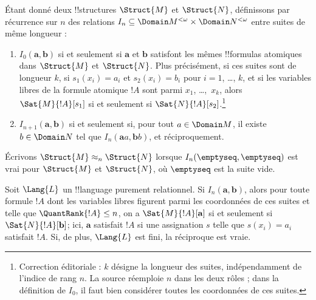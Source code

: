 \documentclass[../../../include/open-logic-section]{subfiles}
\begin{document}
\begin{defn}
  Étant donné deux !!{structure}s $\Struct{M}$ et $\Struct{N}$,
  définissons par récurrence sur $n$ des relations
  $I_n \subseteq \Domain M^{<\omega} \times \Domain N^{<\omega}$
  entre suites de même longueur :
   \begin{enumerate}
   \item $I_0(\mathbf{a},\mathbf{b})$ si et seulement si
     $\mathbf{a}$ et $\mathbf{b}$ satisfont les mêmes
     !!{formula}s atomiques dans $\Struct{M}$ et $\Struct{N}$.
     Plus précisément, si ces suites sont de longueur $k$,
     si $s_1(x_i) = a_i$ et $s_2(x_i) = b_i$ pour
     $i=1$, \dots, $k$, et si les variables libres de
     la formule atomique $!A$ sont parmi $x_1$, \dots,~$x_k$,
     alors $\Sat{M}{!A}[s_1]$ si et seulement si
     $\Sat{N}{!A}[s_2]$.\footnote{Correction éditoriale : $k$ désigne la longueur des suites, indépendamment de l'indice de rang $n$. La source réemploie $n$ dans les deux rôles ; dans la définition de $I_0$, il faut bien considérer toutes les coordonnées de ces suites.}
   \item $I_{n+1} (\mathbf{a},\mathbf{b})$ si et seulement si,
     pour tout $a\in \Domain M$, il existe
     $b\in \Domain N$ tel que
     $I_n(\mathbf{a}a,\mathbf{b}b)$, et réciproquement.
   \end{enumerate}
\end{defn}

\begin{defn}
  Écrivons $\Struct{M} \approx_n \Struct{N}$ lorsque
  $I_n(\emptyseq,\emptyseq)$ est vrai pour $\Struct{M}$
  et $\Struct{N}$, où $\emptyseq$ est la suite vide.
\end{defn}

\begin{thm}
  Soit $\Lang{L}$ un !!{language} purement relationnel.
  Si $I_n(\mathbf{a},\mathbf{b})$, alors pour toute
  formule $!A$ dont les variables libres figurent parmi
  les coordonnées de ces suites et telle que
  $\QuantRank{!A} \le n$, on a
  $\Sat{M}{!A}[\mathbf{a}]$ si et seulement si
  $\Sat{N}{!A}[\mathbf{b}]$; ici,
  $\mathbf{a}$ satisfait $!A$ si une assignation $s$
  telle que $s(x_i) = a_i$ satisfait $!A$.
  Si, de plus, $\Lang{L}$ est fini, la réciproque est vraie.
\end{thm}
\end{document}
